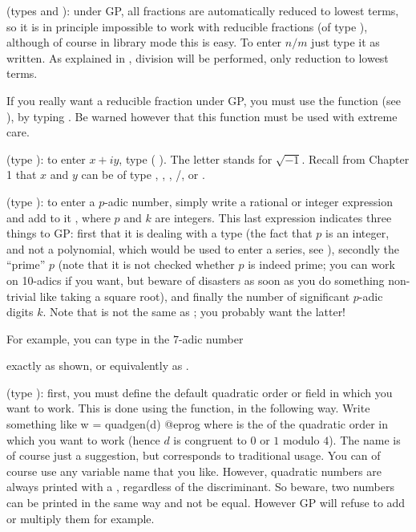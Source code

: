 (types  and ): under GP, all fractions are
automatically reduced to lowest terms, so it is in principle impossible to
work with reducible fractions (of type ), although of course in
library mode this is easy. To enter $n/m$ just type it as written. As
explained in , division will  be performed, only
reduction to lowest terms.\label{se:FRAC}

If you really want a reducible fraction under GP, you must use the 
function (see ), by typing . Be warned
however that this function must be used with extreme care.

(type ): to enter $x+iy$, type  (
). The letter  stands for $\sqrt{-1}$. Recall from
Chapter 1 that $x$ and $y$ can be of type , ,
, /, or .

\label{se:padic}
(type ): to enter a $p$-adic number, simply write a
rational or integer expression and add to it , where $p$
and $k$ are integers. This last expression indicates three things to GP:
first that it is dealing with a  type (the fact that $p$ is an
integer, and not a polynomial, which would be used to enter a series, see
), secondly the ``prime'' $p$ (note that it is not
checked whether $p$ is indeed prime; you can work on 10-adics if you want, but
beware of disasters as soon as you do something non-trivial like taking a
square root), and finally the number of significant $p$-adic digits $k$.
Note that  is not the same as ; you probably
want the latter!

For example, you can type in the $7$-adic number


\noindent
exactly as shown, or equivalently as
.

(type ): first, you must define the default quadratic order or
field in which you want to work. This is done using the 
function, in the following way. Write something like
\bprog
w = quadgen(d)
@eprog\noindent
where  is the  of the quadratic order in
which you want to work (hence $d$ is congruent to $0$ or $1$ modulo $4$). The
name  is of course just a suggestion, but corresponds to traditional
usage. You can of course use any variable name that you like. However,
quadratic numbers are always printed with a , regardless of the
discriminant. So beware, two numbers can be printed in the same way and not
be equal. However GP will refuse to add or multiply them for example.

